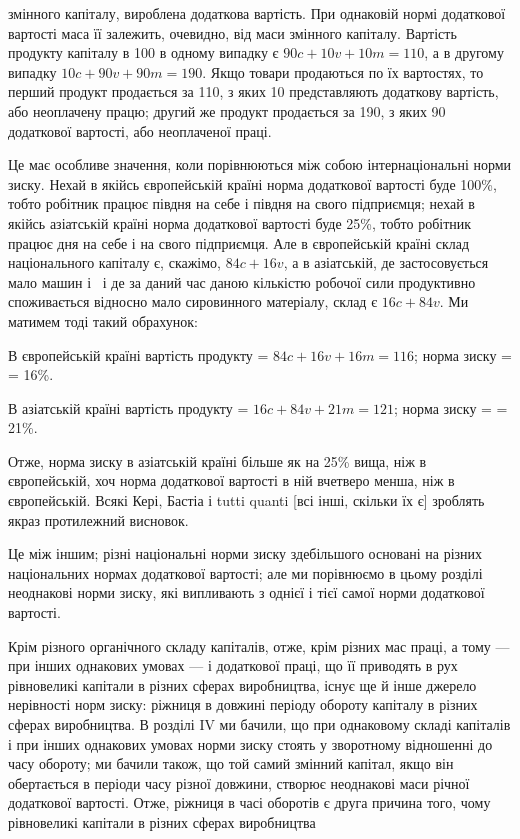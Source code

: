 \parcont{}  %
змінного капіталу, вироблена додаткова вартість. При однаковій
нормі додаткової вартості маса її залежить, очевидно, від маси
змінного капіталу. Вартість продукту капіталу в 100 в одному
випадку є $90 c + 10 v + 10 m = 110$, а в другому випадку $10 c + 90 v + 90 m = 190$. Якщо товари
продаються по їх вартостях,
то перший продукт продається за 110, з яких 10 представляють додаткову вартість, або неоплачену
працю; другий же
продукт продається за 190, з яких 90 додаткової вартості, або
неоплаченої праці.

Це має особливе значення, коли порівнюються між собою
інтернаціональні норми зиску. Нехай в якійсь європейській країні
норма додаткової вартості буде 100\%, тобто робітник працює
півдня на себе і півдня на свого підприємця; нехай в якійсь
азіатській країні норма додаткової вартості буде 25\%, тобто робітник працює  дня на себе і  на
свого підприємця. Але
в європейській країні склад національного капіталу є, скажімо,
$84 c + 16 v$, а в азіатській, де застосовується мало машин і~
і де за даний час даною кількістю робочої сили продуктивно
споживається відносно мало сировинного матеріалу, склад є
$16 c + 84 v$. Ми матимем тоді такий обрахунок:

В європейській країні вартість продукту = $84 c + 16 v + 16 m = 116$; норма зиску =  = 16\%.

В азіатській країні вартість продукту = $16 c + 84 v + 21 m = 121$; норма зиску =  = 21\%.

Отже, норма зиску в азіатській країні більше як на 25\% вища, ніж в європейській, хоч норма
додаткової вартості в ній
вчетверо менша, ніж в європейській. Всякі Кері, Бастіа і tutti quanti [всі інші, скільки їх є]
зроблять якраз протилежний висновок.

Це між іншим; різні національні норми зиску здебільшого
основані на різних національних нормах додаткової вартості;
але ми порівнюємо в цьому розділі неоднакові норми зиску,
які випливають з однієї і тієї самої норми додаткової вартості.

Крім різного органічного складу капіталів, отже, крім різних
мас праці, а тому — при інших однакових умовах — і додаткової
праці, що її приводять в рух рівновеликі капітали в різних сферах
виробництва, існує ще й інше джерело нерівності норм зиску:
ріжниця в довжині періоду обороту капіталу в різних сферах
виробництва. В розділі IV ми бачили, що при однаковому складі
капіталів і при інших однакових умовах норми зиску стоять у зворотному відношенні до часу обороту;
ми бачили також, що
той самий змінний капітал, якщо він обертається в періоди
часу різної довжини, створює неоднакові маси річної додаткової вартості. Отже, ріжниця в часі
оборотів є друга причина
того, чому рівновеликі капітали в різних сферах виробництва
\parbreak{}  %
